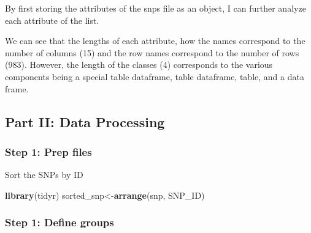 \documentclass[]{article}
\newenvironment{Shaded}{\begin{snugshade}}{\end{snugshade}}
\newcommand{\KeywordTok}[1]{\textcolor[rgb]{0.13,0.29,0.53}{\textbf{#1}}}
\newcommand{\NormalTok}[1]{#1}
\newcommand{\OperatorTok}[1]{\textcolor[rgb]{0.81,0.36,0.00}{\textbf{#1}}}
\newcommand{\StringTok}[1]{\textcolor[rgb]{0.31,0.60,0.02}{#1}}
\begin{document}
By first storing the attributes of the snps file as an object, I can
further analyze each attribute of the list.

\begin{Shaded}
\end{Shaded}

We can see that the lengths of each attribute, how the names correspond
to the number of columns (15) and the row names correspond to the number
of rows (983). However, the length of the classes (4) corresponds to the
various components being a special table dataframe, table dataframe,
table, and a data frame.

\hypertarget{part-ii-data-processing}{%
\subsection{Part II: Data Processing}\label{part-ii-data-processing}}

\hypertarget{step-1-prep-files}{%
\subsubsection{Step 1: Prep files}\label{step-1-prep-files}}

Sort the SNPs by ID

\begin{Shaded}
\begin{Highlighting}[]
\KeywordTok{library}\NormalTok{(tidyr)}
\NormalTok{sorted_snp<-}\KeywordTok{arrange}\NormalTok{(snp, SNP_ID)}
\end{Highlighting}
\end{Shaded}

\hypertarget{step-1-define-groups}{%
\subsubsection{Step 1: Define groups}\label{step-1-define-groups}}
\end{document}
